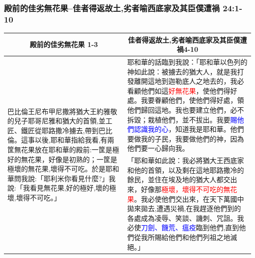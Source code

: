 \subsubsection{殿前的佳劣無花果--佳者得返故土,劣者喻西底家及其臣僕遭禍 24:1-10}
\begin{table}[H]
\centering
\begin{tabular}{p{5.25cm}|p{11.5cm}}\hline\hline
\multicolumn{1}{c|}{殿前的佳劣無花果 1-3}&\multicolumn{1}{c}{佳者得返故土,劣者喻西底家及其臣僕遭禍4-10}\\\hline
\multirow{2}{5.5cm}{巴比倫王尼布甲尼撒將猶大王約雅敬的兒子耶哥尼雅和猶大的首領,並工匠、鐵匠從耶路撒冷擄去,帶到巴比倫。這事以後,耶和華指給我看,有兩筐無花果放在耶和華的殿前:一筐是極好的無花果，好像是初熟的；一筐是極壞的無花果,壞得不可吃。於是耶和華問我說:「耶利米你看見什麼?」我說:「我看見無花果,好的極好,壞的極壞,壞得不可吃。」}
&耶和華的話臨到我說：「耶和華以色列的神如此說：被擄去的猶大人，就是我打發離開這地到迦勒底人之地去的，我必看顧他們如這\textcolor{red}{好無花果}，使他們得好處。我要眷顧他們，使他們得好處，領他們歸回這地。我也要建立他們，必不拆毀；栽植他們，並不拔出。我要\textcolor{blue}{賜他們認識我的心}，知道我是耶和華。他們要做我的子民，我要做他們的神，因為他們要一心歸向我。\\\cline{2-2}
&「耶和華如此說：我必將猶大王西底家和他的首領，以及剩在這地耶路撒冷的餘民，並住在埃及地的猶大人都交出來，好像那\textcolor{red}{極壞，壞得不可吃的無花果}。我必使他們交出來，在天下萬國中拋來拋去,遭遇災禍,在我趕逐他們到的各處成為凌辱、笑談、譏刺、咒詛。我必使\textcolor{blue}{刀劍、饑荒、瘟疫}臨到他們,直到他們從我所賜給他們和他們列祖之地滅絕。」\\\hline
\end{tabular}
\end{table}


